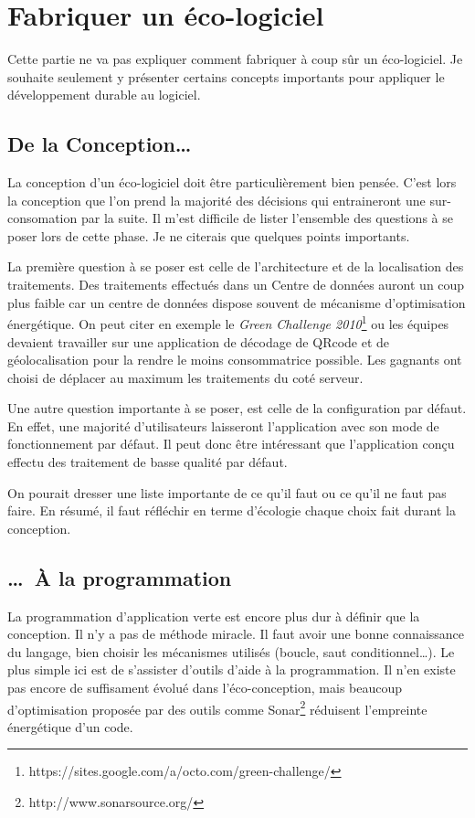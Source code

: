 \documentclass[a4paper, 11pt]{report}
\begin{document}
	\section{Fabriquer un éco-logiciel}
Cette partie ne va pas expliquer comment fabriquer à coup sûr un éco-logiciel. Je souhaite seulement y présenter certains concepts importants pour appliquer le développement durable au logiciel.
		\subsection{De la Conception\ldots}
La conception d'un éco-logiciel doit être particulièrement bien pensée. C'est lors la conception que l'on prend la majorité des décisions qui entraineront une sur-consomation par la suite. Il m'est difficile de lister l'ensemble des questions à se poser lors de cette phase. Je ne citerais que quelques points importants.

La première question à se poser est celle de l'architecture et de la localisation des traitements\cite{EcoLogiciels}. Des traitements effectués dans un Centre de données auront un coup plus faible car un centre de données dispose souvent de mécanisme d'optimisation énergétique. On peut citer en exemple le \textit{Green Challenge 2010}\footnote{https://sites.google.com/a/octo.com/green-challenge/} ou les équipes devaient travailler sur une application de décodage de QRcode et de géolocalisation pour la rendre le moins consommatrice possible. Les gagnants ont choisi de déplacer au maximum les traitements du coté serveur. 

Une autre question importante à se poser, est celle de la configuration par défaut\cite{GreenPattern}. En effet, une majorité d'utilisateurs laisseront l'application avec son mode de fonctionnement par défaut. Il peut donc être intéressant que l'application conçu effectu des traitement de basse qualité par défaut.

On pourait dresser une liste importante de ce qu'il faut ou ce qu'il ne faut pas faire. En résumé, il faut réfléchir en terme d'écologie chaque choix  fait durant la conception.

		\subsection{\ldots~À la programmation}
La programmation d'application \og verte \fg est encore plus dur à définir que la conception. Il n'y a pas de méthode miracle. Il faut avoir une bonne connaissance du langage, bien choisir les mécanismes utilisés (boucle, saut conditionnel\ldots). Le plus simple ici est de s'assister d'outils d'aide à la programmation. Il n'en existe pas encore de suffisament évolué dans l'éco-conception, mais beaucoup d'optimisation proposée par des outils comme Sonar\footnote{http://www.sonarsource.org/} réduisent l'empreinte énergétique d'un code.
\end{document}
